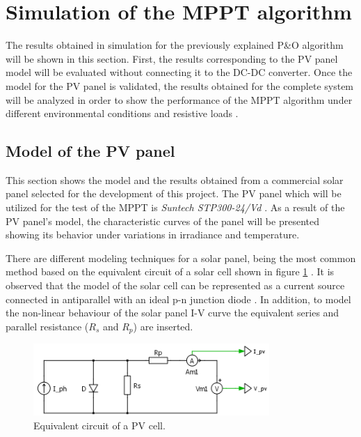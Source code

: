 
\section{Simulation of the MPPT algorithm} \label{MPPTSimulation}

The results obtained in simulation for the previously explained P\&O algorithm will be shown in this section. First, the results corresponding to the PV panel model will be evaluated without connecting it to the DC-DC converter. Once the model for the PV panel is validated, the results obtained for the complete system will be analyzed in order to show the performance of the MPPT algorithm under different environmental conditions and resistive loads .  

\subsection{Model of the PV panel}

This section shows the model and the results obtained from a commercial solar panel selected for the development of this project. The PV panel which will be utilized for the test of the MPPT is \textit{Suntech STP300-24/Vd} . As a result of the PV panel's model, the characteristic curves of the panel will be presented showing its behavior under variations in irradiance and temperature.

There are different modeling techniques for a solar panel, being the most common method based on the equivalent circuit of a solar cell shown in figure \ref{fig:eq_circuit_PVcell} . It is observed that the model of the solar cell can be represented as a current source connected in antiparallel with an ideal p-n junction diode . In addition, to model the non-linear behaviour of the solar panel I-V curve the equivalent series and parallel resistance ($R_{s}$ and $R_{p}$) are inserted.


\begin{figure}[H]
	\begin{center}
		\includegraphics[width=0.8\textwidth]{../Pictures/schematic_pv_cell}
		\caption{Equivalent circuit of a PV cell.}
		\label{fig:eq_circuit_PVcell} 
	\end{center}	
\end{figure}

